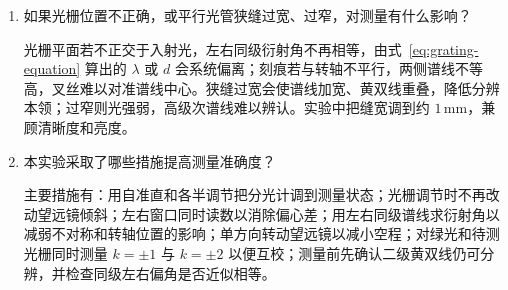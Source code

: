 \documentclass{../template/myrpt}
\begin{document}
\begin{enumerate}[label=\arabic*. ]
  强像由光栅前表面（空气--玻璃界面）反射形成，光强损失小；弱像由后表面反射形成，光线往返穿过玻璃基底，因而较暗。调整时只以强像为准，调节载物台螺钉 1、2，使强像与上叉丝重合，忽略弱像，并且不再改动已经调好的望远镜。

  \item 如果光栅位置不正确，或平行光管狭缝过宽、过窄，对测量有什么影响？

  光栅平面若不正交于入射光，左右同级衍射角不再相等，由式~\eqref{eq:grating-equation} 算出的 $\lambda$ 或 $d$ 会系统偏离；刻痕若与转轴不平行，两侧谱线不等高，叉丝难以对准谱线中心。狭缝过宽会使谱线加宽、黄双线重叠，降低分辨本领；过窄则光强弱，高级次谱线难以辨认。实验中把缝宽调到约 $1\,\si{\milli\metre}$，兼顾清晰度和亮度。

  \item 本实验采取了哪些措施提高测量准确度？

  主要措施有：用自准直和各半调节把分光计调到测量状态；光栅调节时不再改动望远镜倾斜；左右窗口同时读数以消除偏心差；用左右同级谱线求衍射角以减弱不对称和转轴位置的影响；单方向转动望远镜以减小空程；对绿光和待测光栅同时测量 $k=\pm1$ 与 $k=\pm2$ 以便互校；测量前先确认二级黄双线仍可分辨，并检查同级左右偏角是否近似相等。
\end{enumerate}
\fi

\insertSignedDataPage
\end{document}
